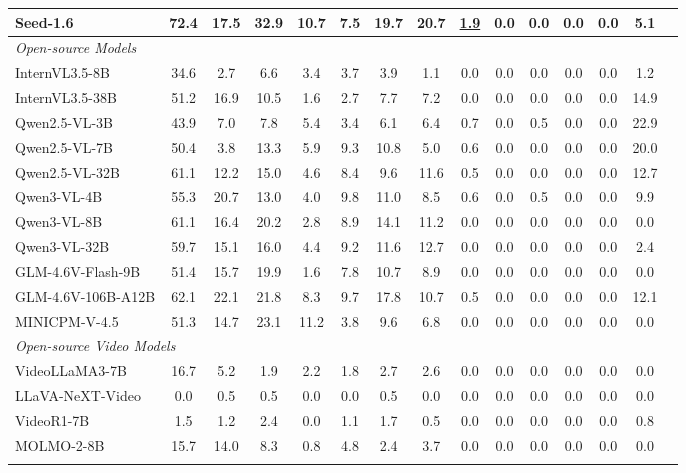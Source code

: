 \begin{table}[t]
{\begin{tabular}{l | cc | ccccc | cccccc | c}
Seed-1.6 & 72.4 & 17.5 & 32.9 & 10.7 & 7.5 & 19.7 & 20.7 & \underline{1.9} & 0.0 & 0.0 & 0.0 & 0.0 & \textbf{5.1} & \cellcolor{gray!15}{14.5} \\
\hline
\multicolumn{15}{l}{\emph{Open-source Models}} \\
InternVL3.5-8B & 34.6 & 2.7 & 6.6 & 3.4 & 3.7 & 3.9 & 1.1 & 0.0 & 0.0 & 0.0 & 0.0 & 0.0 & 1.2 & \cellcolor{gray!15}{4.4} \\
InternVL3.5-38B & 51.2 & 16.9 & 10.5 & 1.6 & 2.7 & 7.7 & 7.2 & 0.0 & 0.0 & 0.0 & 0.0 & 0.0 & 14.9 & \cellcolor{gray!15}{8.7} \\
Qwen2.5-VL-3B & 43.9 & 7.0 & 7.8 & 5.4 & 3.4 & 6.1 & 6.4 & 0.7 & 0.0 & 0.5 & 0.0 & 0.0 & 22.9 & \cellcolor{gray!15}{8.0} \\
Qwen2.5-VL-7B & 50.4 & 3.8 & 13.3 & 5.9 & 9.3 & 10.8 & 5.0 & 0.6 & 0.0 & 0.0 & 0.0 & 0.0 & 20.0 & \cellcolor{gray!15}{9.1} \\
Qwen2.5-VL-32B & 61.1 & 12.2 & 15.0 & 4.6 & 8.4 & 9.6 & 11.6 & 0.5 & 0.0 & 0.0 & 0.0 & 0.0 & 12.7 & \cellcolor{gray!15}{10.4} \\
Qwen3-VL-4B & 55.3 & 20.7 & 13.0 & 4.0 & 9.8 & 11.0 & 8.5 & 0.6 & 0.0 & 0.5 & 0.0 & 0.0 & 9.9 & \cellcolor{gray!15}{10.3} \\
Qwen3-VL-8B & 61.1 & 16.4 & 20.2 & 2.8 & 8.9 & 14.1 & 11.2 & 0.0 & 0.0 & 0.0 & 0.0 & 0.0 & 0.0 & \cellcolor{gray!15}{10.4} \\
Qwen3-VL-32B & 59.7 & 15.1 & 16.0 & 4.4 & 9.2 & 11.6 & 12.7 & 0.0 & 0.0 & 0.0 & 0.0 & 0.0 & 2.4 & \cellcolor{gray!15}{10.1} \\
GLM-4.6V-Flash-9B & 51.4 & 15.7 & 19.9 & 1.6 & 7.8 & 10.7 & 8.9 & 0.0 & 0.0 & 0.0 & 0.0 & 0.0 & 0.0 & \cellcolor{gray!15}{8.9} \\
GLM-4.6V-106B-A12B & 62.1 & 22.1 & 21.8 & 8.3 & 9.7 & 17.8 & 10.7 & 0.5 & 0.0 & 0.0 & 0.0 & 0.0 & 12.1 & \cellcolor{gray!15}{12.7} \\
MINICPM-V-4.5 & 51.3 & 14.7 & 23.1 & 11.2 & 3.8 & 9.6 & 6.8 & 0.0 & 0.0 & 0.0 & 0.0 & 0.0 & 0.0 & \cellcolor{gray!15}{9.3} \\
\hline
\multicolumn{15}{l}{\emph{Open-source Video Models}} \\
VideoLLaMA3-7B & 16.7 & 5.2 & 1.9 & 2.2 & 1.8 & 2.7 & 2.6 & 0.0 & 0.0 & 0.0 & 0.0 & 0.0 & 0.0 & \cellcolor{gray!15}{2.5} \\
LLaVA-NeXT-Video & 0.0 & 0.5 & 0.5 & 0.0 & 0.0 & 0.5 & 0.0 & 0.0 & 0.0 & 0.0 & 0.0 & 0.0 & 0.0 & \cellcolor{gray!15}{0.1} \\
VideoR1-7B & 1.5 & 1.2 & 2.4 & 0.0 & 1.1 & 1.7 & 0.5 & 0.0 & 0.0 & 0.0 & 0.0 & 0.0 & 0.8 & \cellcolor{gray!15}{0.7} \\
MOLMO-2-8B & 15.7 & 14.0 & 8.3 & 0.8 & 4.8 & 2.4 & 3.7 & 0.0 & 0.0 & 0.0 & 0.0 & 0.0 & 0.0 & \cellcolor{gray!15}{3.8} \\
\hline
\Xhline{1pt}
\end{tabular}
}
\end{table}

